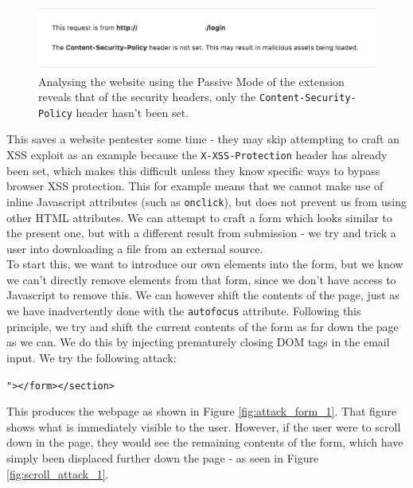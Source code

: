 \begin{figure}[h!]
	\centering
	\includegraphics[width=\linewidth]{images/test_case_1/passive_analysis.png}
	\caption{Analysing the website using the Passive Mode of the extension reveals that of the security headers, only the \texttt{Content-Security-Policy} header hasn't been set. }
	\label{fig:passive_analysis}	
\end{figure} 

This saves a website pentester some time - they may skip attempting to craft an XSS exploit as an example because the \texttt{X-XSS-Protection} header has already been set, which makes this difficult unless they know specific ways to bypass browser XSS protection. This for example means that we cannot make use of inline Javascript attributes (such as \texttt{onclick}), but does not prevent us from using other HTML attributes. We can attempt to craft a form which looks similar to the present one, but with a different result from submission - we try and trick a user into downloading a file from an external source. \\

To start this, we want to introduce our own elements into the form, but we know we can't directly remove elements from that form, since we don't have access to Javascript to remove this. We can however shift the contents of the page, just as we have inadvertently done with the \texttt{autofocus} attribute. Following this principle, we try and shift the current contents of the form as far down the page as we can. We do this by injecting prematurely closing DOM tags in the email input. We try the following attack:

\begin{center}
	\texttt{"></form></section>}
\end{center}

This produces the webpage as shown in Figure \ref{fig:attack_form_1}. That figure shows what is immediately visible to the user. However, if the user were to scroll down in the page, they would see the remaining contents of the form, which have simply been displaced further down the page - as seen in Figure \ref{fig:scroll_attack_1}. \\

